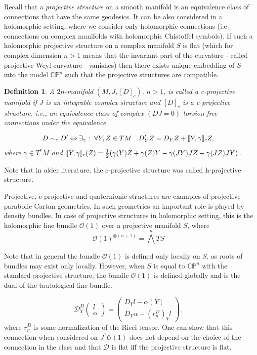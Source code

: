 \documentclass{amsart}
\newtheorem{defi}{Definition}[section]
\newcommand{\abrack}[1]{[\mkern-3mu[#1]\mkern-3mu]}
\begin{document}
Recall that a \emph{projective structure} on a smooth manifold is an equivalence class of connections that have the same geodesics. It can be also considered in a holomorphic setting, where we consider only holomorphic connections (i.e. connections on complex manifolds with holomorphic Chistoffel symbols). If such a holomorphic projective structure on a complex manifold $S$ is flat (which for complex dimension $n>1$ means that the invariant part of the curvature - called projective Weyl curvature - vanishes) then there exists unique embedding of $S$ into the model $\mathbb{CP}^n$ such that the projective structures are compatible. 
\begin{defi}
A $2n$-manifold $(M,J,[D]_c)$, $n>1$, is called a \emph{c-projective} manifold if $J$ is an integrable complex structure and $[D]_c$ is a c-projective structure, i.e., an equivalence class of complex $(DJ=0)$ torsion-free connections under the equivalence

$$D\sim_c D' \Leftrightarrow \exists_{\gamma}:\ \forall Y,Z\in TM \quad D'_YZ=D_YZ +\abrack{Y,\gamma}_cZ,$$
where $\gamma\in T^*M$ and $\abrack{Y,\gamma}_c(Z)=\frac{1}{2}(\gamma (Y)Z+\gamma (Z)Y-\gamma(JY)JZ-\gamma(JZ)JY)$.


\end{defi}
Note that in older literature, the c-projective structure was called h-projective structure.

 Projective, c-projective and quaternionic structures are examples of projective parabolic Cartan geometries. In such geometries an important role is played by density bundles. In case of  projective structures in holomorphic setting, this is the holomorphic line bundle $\mathcal{O}(1)$ over a projective manifold $S$, where \begin{equation}
     \mathcal{O}(1)^{\otimes (n+1)}=\bigwedge^{n}TS
 \end{equation}\label{c}

 Note that in general the bundle $\mathcal{O}(1)$ is defined only locally on $S$, as roots of bundles may exist only locally. However, when $S$ is equal to $\mathbb{CP}^n$ with the standard projective structure, the bundle $\mathcal{O}(1)$ is defined globally and is the dual of the tautological line bundle.
 
\begin{equation}\label{tra}
    \mathcal{D}^D_Y\left(\begin{array}{c}l\\\alpha\end{array}\right)=\left(\begin{array}{c}D_Yl-\alpha(Y)\\ D_Y\alpha+(r_p^D)_Yl\end{array}\right),
\end{equation}
where  $r_p^D$ is some normalization of the Ricci tensor.
One can show that this connection when considered on $J^1\mathcal{O}(1)$ does not depend on the choice of the connection in the class and that $\mathcal{D} $ is flat iff the projective structure is flat. 
\end{document}
